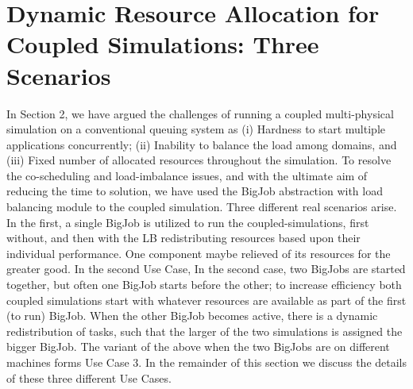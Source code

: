\documentclass[conference,final]{IEEEtran}
\begin{document}





\section{Dynamic Resource Allocation for Coupled Simulations: Three Scenarios }

In Section 2, we have argued the challenges of running a coupled multi-physical simulation on a conventional queuing system as (i) Hardness to start multiple applications concurrently; (ii) Inability to balance the load among domains, and (iii) Fixed number of allocated resources throughout the simulation.  To resolve the co-scheduling and load-imbalance issues, and with the ultimate aim of reducing the time to solution, we have used the BigJob abstraction with load balancing module to the coupled simulation. %
Three different real scenarios arise. In the first, a single BigJob is utilized to run the coupled-simulations, first without, and then with the LB redistributing resources based upon their individual performance. One component maybe relieved of its resources for the greater good. In the second Use Case, In the second case, two BigJobs are started together, but often one BigJob starts before the other; to increase efficiency both coupled simulations start with whatever resources are available as part of the first (to run) BigJob. When the other BigJob becomes active, there is a dynamic redistribution of tasks, such that
the larger of the two simulations is assigned the bigger BigJob. The variant of the above when
the two BigJobs are on different machines forms Use Case 3. In the remainder of this section we discuss
the details of these three different Use Cases.
\end{document}
